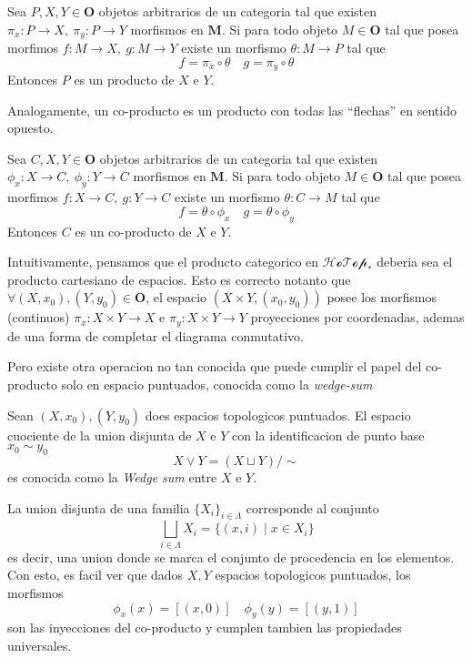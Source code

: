 \begin{definicion}
  Sea \(P , X , Y \in \mathbf O\) objetos arbitrarios de un categoria
  tal que existen \(\pi_x : P \to X,\ \pi_y : P \to Y\) morfismos en
  \(\mathbf M\). Si para todo objeto \(M \in \mathbf O\) tal que posea
  morfimos \( f : M \to X,\ g : M \to Y\) existe un morfismo \(\theta :
  M \to P\) tal que
  \[ f = \pi_x \circ \theta \quad g = \pi_y \circ \theta \]
  Entonces \(P\) es un producto de \(X\) e \(Y\).
\end{definicion}
Analogamente, un co-producto es un producto con todas las ``flechas'' en
sentido opuesto.
\begin{definicion}
  Sea \(C , X , Y \in \mathbf O\) objetos arbitrarios de un categoria
  tal que existen \(\phi_x : X \to C,\ \phi_y : Y \to C\) morfismos en
  \(\mathbf M\). Si para todo objeto \(M \in \mathbf O\) tal que posea
  morfimos \( f : X \to C,\ g : Y \to C\) existe un morfismo \(\theta :
  C \to M\) tal que
  \[ f = \theta \circ \phi_x \quad g = \theta \circ \phi_y \]
  Entonces \(C\) es un co-producto de \(X\) e \(Y\).
\end{definicion}
Intuitivamente, pensamos que el producto categorico en
\(\mathscr{HoTop}_*\) deberia sea el producto cartesiano de espacios.
Esto es correcto notanto que \(\forall (X,x_0) , (Y, y_0) \in \mathbf O
\), el espacio \((X \times Y, (x_0, y_0))\) posee los morfismos
(continuos) \(\pi_x : X \times Y \to X \) e \(\pi_y : X \times Y \to Y
\) proyecciones por coordenadas, ademas de una forma de completar el
diagrama conmutativo.

Pero existe otra operacion no tan conocida que puede cumplir el papel
del co-producto solo en espacio puntuados, conocida como la \emph{wedge-sum}
\begin{definicion}
  Sean \((X, x_0),(Y, y_0)\) does espacios topologicos puntuados. El
  espacio cuociente de la union disjunta de \(X\) e \(Y\) con la
  identificacion de punto base \(x_0 \sim y_0\)
  \[ X \vee Y = (X \sqcup Y) / \sim \]
  es conocida como la \emph{Wedge sum} entre \(X\) e \(Y\).
\end{definicion}
La union disjunta de una familia \(\{X_i\}_{i \in \Lambda}\) corresponde
al conjunto
\[ \bigsqcup_{i \in \Lambda} X_i = \{ (x, i) \mid x \in X_i \} \]
es decir, una union donde se marca el conjunto de procedencia en los
elementos. Con esto, es facil ver que dados \(X, Y\) espacios topologicos
puntuados, los morfismos
\[ \phi_x (x) = [(x,0)] \quad \phi_y (y) = [(y,1)] \]
son las inyecciones del co-producto y cumplen tambien las propiedades
universales.

